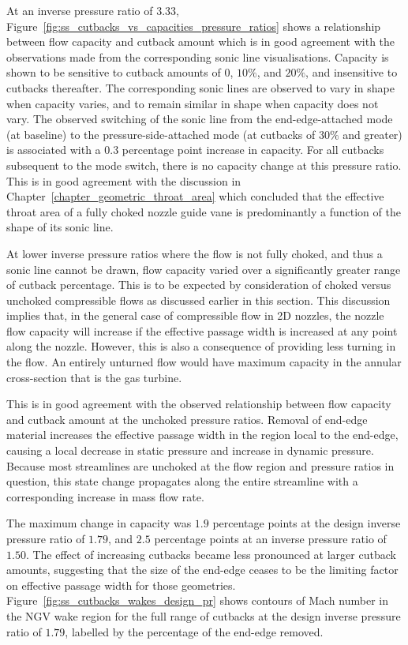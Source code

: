 \documentclass[a4paper, 11pt, oneside]{report}
\begin{document}
At an inverse pressure ratio of $3.33$, Figure~\ref{fig:ss_cutbacks_vs_capacities_pressure_ratios} shows a relationship between flow capacity and cutback amount which is in good agreement with the observations made from the corresponding sonic line visualisations. Capacity is shown to be sensitive to cutback amounts of $0$, $10\%$, and $20\%$, and insensitive to cutbacks thereafter. The corresponding sonic lines are observed to vary in shape when capacity varies, and to remain similar in shape when capacity does not vary. The observed switching of the sonic line from the end-edge-attached mode (at baseline) to the pressure-side-attached mode (at cutbacks of $30\%$ and greater) is associated with a $0.3$ percentage point increase in capacity. For all cutbacks subsequent to the mode switch, there is no capacity change at this pressure ratio. This is in good agreement with the discussion in Chapter~\ref{chapter_geometric_throat_area} which concluded that the effective throat area of a fully choked nozzle guide vane is predominantly a function of the shape of its sonic line.

At lower inverse pressure ratios where the flow is not fully choked, and thus a sonic line cannot be drawn, flow capacity varied over a significantly greater range of cutback percentage. This is to be expected by consideration of choked versus unchoked compressible flows as discussed earlier in this section. This discussion implies that, in the general case of compressible flow in 2D nozzles, the nozzle flow capacity will increase if the effective passage width is increased at any point along the nozzle. However, this is also a consequence of providing less turning in the flow. An entirely unturned flow would have maximum capacity in the annular cross-section that is the gas turbine. 

This is in good agreement with the observed relationship between flow capacity and cutback amount at the unchoked pressure ratios. Removal of end-edge material increases the effective passage width in the region local to the end-edge, causing a local decrease in static pressure and increase in dynamic pressure. Because most streamlines are unchoked at the flow region and pressure ratios in question, this state change propagates along the entire streamline with a corresponding increase in mass flow rate.

\newpage
The maximum change in capacity was $1.9$ percentage points at the design inverse pressure ratio of $1.79$, and $2.5$ percentage points at an inverse pressure ratio of $1.50$. The effect of increasing cutbacks became less pronounced at larger cutback amounts, suggesting that the size of the end-edge ceases to be the limiting factor on effective passage width for those geometries. Figure~\ref{fig:ss_cutbacks_wakes_design_pr} shows contours of Mach number in the NGV wake region for the full range of cutbacks at the design inverse pressure ratio of $1.79$, labelled by the percentage of the end-edge removed.
\end{document}
